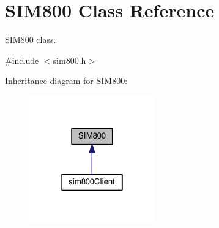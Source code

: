 \hypertarget{classSIM800}{}\section{S\+I\+M800 Class Reference}
\label{classSIM800}


\hyperlink{classSIM800}{S\+I\+M800} class.  




{\ttfamily \#include $<$sim800.\+h$>$}



Inheritance diagram for S\+I\+M800\+:\nopagebreak
\begin{figure}[H]
\begin{center}
\leavevmode
\includegraphics[width=154pt]{classSIM800__inherit__graph}
\end{center}
\end{figure}
